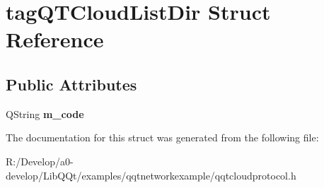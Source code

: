 \hypertarget{structtag_q_t_cloud_list_dir}{}\section{tag\+Q\+T\+Cloud\+List\+Dir Struct Reference}
\label{structtag_q_t_cloud_list_dir}
\subsection*{Public Attributes}
\begin{DoxyCompactItemize}
\item 
\mbox{\label{structtag_q_t_cloud_list_dir_a11a6280fadb4637cb9ca211cb9f5b6e8}} 
Q\+String {\bfseries m\+\_\+code}
\end{DoxyCompactItemize}


The documentation for this struct was generated from the following file\+:\begin{DoxyCompactItemize}
\item 
R\+:/\+Develop/a0-\/develop/\+Lib\+Q\+Qt/examples/qqtnetworkexample/qqtcloudprotocol.\+h\end{DoxyCompactItemize}
